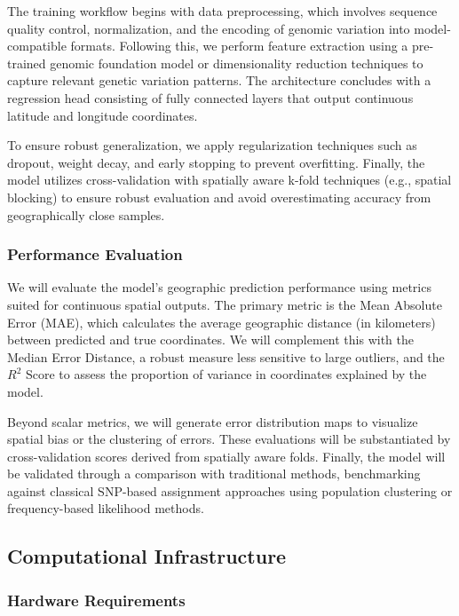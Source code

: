 The training workflow begins with data preprocessing, which involves sequence quality control, normalization, and the encoding of genomic variation into model-compatible formats. Following this, we perform feature extraction using a pre-trained genomic foundation model or dimensionality reduction techniques to capture relevant genetic variation patterns. The architecture concludes with a regression head consisting of fully connected layers that output continuous latitude and longitude coordinates.

To ensure robust generalization, we apply regularization techniques such as dropout, weight decay, and early stopping to prevent overfitting. Finally, the model utilizes cross-validation with spatially aware k-fold techniques (e.g., spatial blocking) to ensure robust evaluation and avoid overestimating accuracy from geographically close samples.

\subsubsection{Performance Evaluation}

We will evaluate the model's geographic prediction performance using metrics suited for continuous spatial outputs. The primary metric is the Mean Absolute Error (MAE), which calculates the average geographic distance (in kilometers) between predicted and true coordinates. We will complement this with the Median Error Distance, a robust measure less sensitive to large outliers, and the $R^2$ Score to assess the proportion of variance in coordinates explained by the model.

Beyond scalar metrics, we will generate error distribution maps to visualize spatial bias or the clustering of errors. These evaluations will be substantiated by cross-validation scores derived from spatially aware folds. Finally, the model will be validated through a comparison with traditional methods, benchmarking against classical SNP-based assignment approaches using population clustering or frequency-based likelihood methods.

\subsection{Computational Infrastructure}

\subsubsection{Hardware Requirements}

